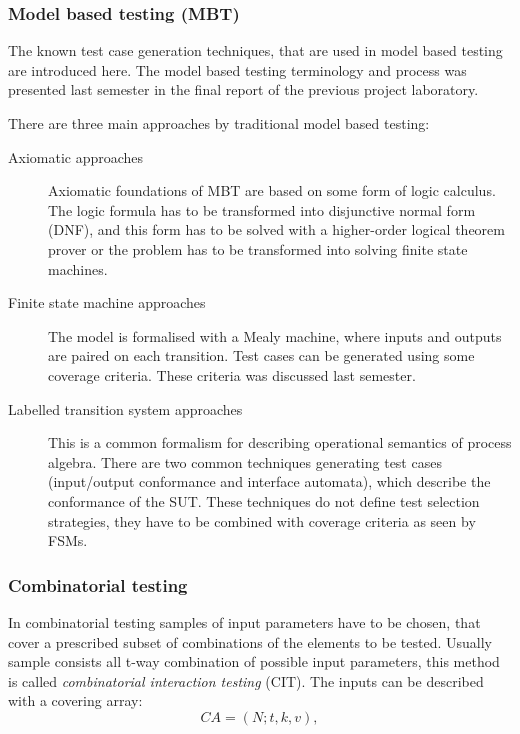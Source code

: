 
\subsubsection{Model based testing (MBT)}
\label{ssub:mbt}

The known test case generation techniques, that are used in model based testing are introduced here. The model based testing terminology and process was presented last semester in the final report of the previous project laboratory.

There are three main approaches by traditional model based testing:

\begin{description}
	\item[Axiomatic approaches] Axiomatic foundations of MBT are based on some form of logic calculus. The logic formula has to be transformed into disjunctive normal form (DNF), and this form has to be solved with a higher-order logical theorem prover or the problem has to be transformed into solving finite state machines.
	\item[Finite state machine approaches] The model is formalised with a Mealy machine, where inputs and outputs are paired on each transition. Test cases can be generated using some coverage criteria. These criteria was discussed last semester.
	\item[Labelled transition system approaches] This is a common formalism for describing operational semantics of process algebra. There are two common techniques generating test cases (input/output conformance and interface automata), which describe the conformance of the SUT. These techniques do not define test selection strategies, they have to be combined with coverage criteria as seen by FSMs.
\end{description}


\subsubsection{Combinatorial testing}
\label{ssub:combinatorialtesting}

In combinatorial testing samples of input parameters have to be chosen, that cover a prescribed subset of combinations of the elements to be tested. Usually sample consists all t-way combination of possible input parameters, this method is called \textit{combinatorial interaction testing} (CIT). The inputs can be described with a covering array:
\begin{displaymath}
CA=(N;t, k, v),
\end{displaymath}

